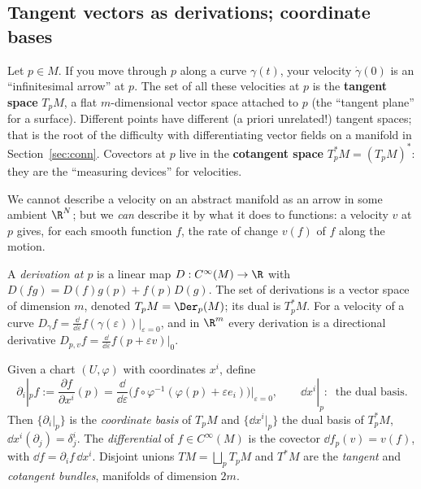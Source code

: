 \subsection{Tangent vectors as derivations; coordinate bases}\label{sec:tangentvectors}
\begin{intuition}[{velocities}]
Let $p\in M$. If you move through $p$ along a curve $\gamma(t)$, your velocity $\dot\gamma(0)$ is an ``infinitesimal arrow'' at $p$. The set of all these velocities at $p$ is the \textbf{tangent space} $T_pM$, a flat $m$-dimensional vector space attached to $p$ (the ``tangent plane'' for a surface). Different points have different (a priori unrelated!) tangent spaces; that is the root of the difficulty with differentiating vector fields on a manifold in Section~\ref{sec:conn}. Covectors at $p$ live in the \textbf{cotangent space} $T^*_pM=(T_pM)^*$: they are the ``measuring devices'' for velocities.

We cannot describe a velocity on an abstract manifold as an arrow in some ambient $\R^N$; but we \emph{can} describe it by what it does to functions: a velocity $v$ at $p$ gives, for each smooth function $f$, the rate of change $v(f)$ of $f$ along the motion.
\end{intuition}

\begin{formal}
A \emph{derivation at $p$} is a linear map $D:C^\infty(M)\to\R$ with $D(fg)=D(f)g(p)+f(p)D(g)$. The set of derivations is a vector space of dimension $m$, denoted $T_pM=\Der_p(M)$; its dual is $T^*_pM$. For a velocity of a curve $D_\gamma f=\frac{\dd}{\dd\varepsilon}f(\gamma(\varepsilon))|_{\varepsilon=0}$, and in $\R^m$ every derivation is a directional derivative $D_{p,v}f=\frac{\dd}{\dd\varepsilon}f(p+\varepsilon v)|_0$.

Given a chart $(U,\varphi)$ with coordinates $x^i$, define
\[
\partial_i|_p f:=\frac{\partial f}{\partial x^i}(p)=\frac{\dd}{\dd\varepsilon}\Big(f\circ\varphi^{-1}(\varphi(p)+\varepsilon e_i)\Big)\Big|_{\varepsilon=0},\qquad
\dd x^i|_p:\ \text{ the dual basis.}
\]
Then $\{\partial_i|_p\}$ is the \emph{coordinate basis} of $T_pM$ and $\{\dd x^i|_p\}$ the dual basis of $T_p^*M$, \ie $\dd x^i(\partial_j)=\delta^i_j$. The \emph{differential} of $f\in C^\infty(M)$ is the covector $\dd f_p(v)=v(f)$, with $\dd f=\partial_if\,\dd x^i$. Disjoint unions $TM=\bigsqcup_pT_pM$ and $T^*M$ are the \emph{tangent} and \emph{cotangent bundles}, manifolds of dimension $2m$.
\end{formal}
